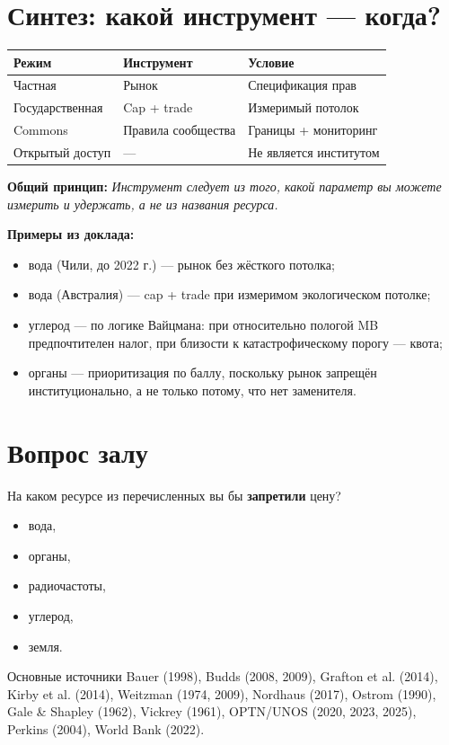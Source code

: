 \documentclass[11pt]{article}
\begin{document}
\section{Синтез: какой инструмент — когда?}

\begin{tabular}{@{}lll@{}}
\toprule
\textbf{Режим} & \textbf{Инструмент} & \textbf{Условие} \\
\midrule
Частная & Рынок & Спецификация прав \\
Государственная & Cap + trade & Измеримый потолок \\
Commons & Правила сообщества & Границы + мониторинг \\
Открытый доступ & — & Не является институтом \\
\bottomrule
\end{tabular}
\vspace{0.5cm}

\textbf{Общий принцип:}
\textit{Инструмент следует из того, какой параметр вы можете измерить и удержать, а не из названия ресурса.}

\textbf{Примеры из доклада:}
\begin{itemize}
\item вода (Чили, до 2022 г.) — рынок без жёсткого потолка;
\item вода (Австралия) — cap + trade при измеримом экологическом потолке;
\item углерод — по логике Вайцмана: при относительно пологой MB предпочтителен налог, при близости к катастрофическому порогу — квота;
\item органы — приоритизация по баллу, поскольку рынок запрещён институционально, а не только потому, что нет заменителя.
\end{itemize}

\section{Вопрос залу}

На каком ресурсе из перечисленных вы бы \textbf{запретили} цену?
\begin{itemize}
\item вода,
\item органы,
\item радиочастоты,
\item углерод,
\item земля.
\end{itemize}

\vspace{1cm}
\begin{tcolorbox}{Основные источники}
Bauer (1998), Budds (2008, 2009), Grafton et al. (2014), Kirby et al. (2014), Weitzman (1974, 2009), Nordhaus (2017), Ostrom (1990), Gale \& Shapley (1962), Vickrey (1961), OPTN/UNOS (2020, 2023, 2025), Perkins (2004), World Bank (2022).
\end{tcolorbox}

\printbibliography
\end{document}
